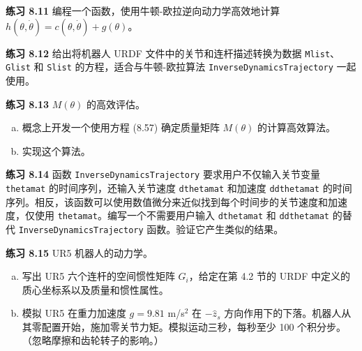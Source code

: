\documentclass[12pt,a4paper]{article}
\begin{document}
\textbf{练习 8.11} 编程一个函数，使用牛顿-欧拉逆向动力学高效地计算 $h(\theta, \dot{\theta}) = c(\theta, \dot{\theta}) + g(\theta)$。

\textbf{练习 8.12} 给出将机器人 URDF 文件中的关节和连杆描述转换为数据 \texttt{Mlist}、\texttt{Glist} 和 \texttt{Slist} 的方程，适合与牛顿-欧拉算法 \texttt{InverseDynamicsTrajectory} 一起使用。

\textbf{练习 8.13} $M(\theta)$ 的高效评估。
\begin{enumerate}[(a)]
\item 概念上开发一个使用方程 (8.57) 确定质量矩阵 $M(\theta)$ 的计算高效算法。
\item 实现这个算法。
\end{enumerate}

\textbf{练习 8.14} 函数 \texttt{InverseDynamicsTrajectory} 要求用户不仅输入关节变量 \texttt{thetamat} 的时间序列，还输入关节速度 \texttt{dthetamat} 和加速度 \texttt{ddthetamat} 的时间序列。相反，该函数可以使用数值微分来近似找到每个时间步的关节速度和加速度，仅使用 \texttt{thetamat}。编写一个不需要用户输入 \texttt{dthetamat} 和 \texttt{ddthetamat} 的替代 \texttt{InverseDynamicsTrajectory} 函数。验证它产生类似的结果。

\textbf{练习 8.15} UR5 机器人的动力学。
\begin{enumerate}[(a)]
\item 写出 UR5 六个连杆的空间惯性矩阵 $G_i$，给定在第 4.2 节的 URDF 中定义的质心坐标系以及质量和惯性属性。
\item 模拟 UR5 在重力加速度 $g = 9.81$ m/s$^2$ 在 $-\hat{z}_s$ 方向作用下的下落。机器人从其零配置开始，施加零关节力矩。模拟运动三秒，每秒至少 100 个积分步。（忽略摩擦和齿轮转子的影响。）
\end{enumerate}
\end{document}
